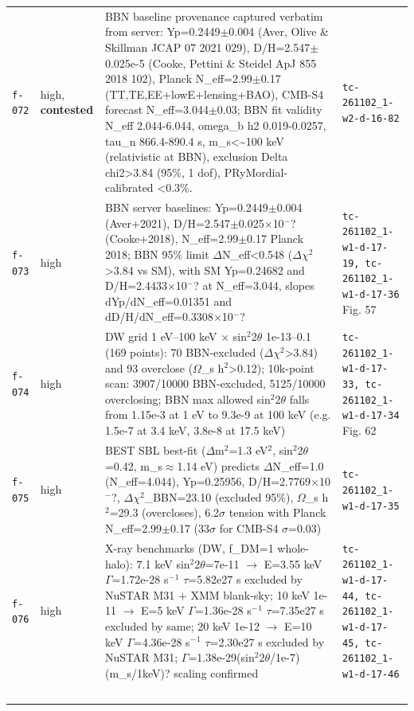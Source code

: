 \documentclass[11pt,a4paper]{article}
\begin{document}
\begin{longtable}{@{}p{}p{}p{}p{}@{}}
\texttt{f-072} & high, \textbf{contested} & BBN baseline provenance captured verbatim from server: Yp=0.2449$\pm$0.004 (Aver, Olive \& Skillman JCAP 07 2021 029), D/H=2.547$\pm$0.025e-5 (Cooke, Pettini \& Steidel ApJ 855 2018 102), Planck N\_eff=2.99$\pm$0.17 (TT,TE,EE+lowE+lensing+BAO), CMB-S4 forecast N\_eff=3.044$\pm$0.03; BBN fit validity N\_eff 2.044-6.044, omega\_b h2 0.019-0.0257, tau\_n 866.4-890.4 s, m\_s\textless{}\textasciitilde{}100 keV (relativistic at BBN), exclusion Delta chi2\textgreater{}3.84 (95\%, 1 dof), PRyMordial-calibrated \textless{}0.3\%. & \texttt{tc-261102\_\allowbreak{}1-w2-d-16-82} \\
\texttt{f-073} & high & BBN server baselines: Yp=0.2449$\pm$0.004 (Aver+2021), D/H=2.547$\pm$0.025$\times$10$^-$? (Cooke+2018), N\_eff=2.99$\pm$0.17 Planck 2018; BBN 95\% limit $\Delta$N\_eff\textless{}0.548 ($\Delta$$\chi$$^2$\textgreater{}3.84 vs SM), with SM Yp=0.24682 and D/H=2.4433$\times$10$^-$? at N\_eff=3.044, slopes dYp/dN\_eff=0.01351 and dD/H/dN\_eff=0.3308$\times$10$^-$? & \texttt{tc-261102\_\allowbreak{}1-w1-d-17-19,\allowbreak{} tc-261102\_\allowbreak{}1-w1-d-17-36} Fig. 57 \\
\texttt{f-074} & high & DW grid 1 eV--100 keV $\times$ sin$^2$2$\theta$ 1e-13--0.1 (169 points): 70 BBN-excluded ($\Delta$$\chi$$^2$\textgreater{}3.84) and 93 overclose ($\Omega$\_s h$^2$\textgreater{}0.12); 10k-point scan: 3907/10000 BBN-excluded, 5125/10000 overclosing; BBN max allowed sin$^2$2$\theta$ falls from 1.15e-3 at 1 eV to 9.3e-9 at 100 keV (e.g. 1.5e-7 at 3.4 keV, 3.8e-8 at 17.5 keV) & \texttt{tc-261102\_\allowbreak{}1-w1-d-17-33,\allowbreak{} tc-261102\_\allowbreak{}1-w1-d-17-34} Fig. 62 \\
\texttt{f-075} & high & BEST SBL best-fit ($\Delta$m$^2$=1.3 eV$^2$, sin$^2$2$\theta$=0.42, m\_s$\approx$1.14 eV) predicts $\Delta$N\_eff=1.0 (N\_eff=4.044), Yp=0.25956, D/H=2.7769$\times$10$^-$?, $\Delta$$\chi$$^2$\_BBN=23.10 (excluded 95\%), $\Omega$\_s h$^2$=29.3 (overcloses), 6.2$\sigma$ tension with Planck N\_eff=2.99$\pm$0.17 (33$\sigma$ for CMB-S4 $\sigma$=0.03) & \texttt{tc-261102\_\allowbreak{}1-w1-d-17-35} \\
\texttt{f-076} & high & X-ray benchmarks (DW, f\_DM=1 whole-halo): 7.1 keV sin$^2$2$\theta$=7e-11 $\to$ E=3.55 keV $\Gamma$=1.72e-28 s$^-$$^1$ $\tau$=5.82e27 s excluded by NuSTAR M31 + XMM blank-sky; 10 keV 1e-11 $\to$ E=5 keV $\Gamma$=1.36e-28 s$^-$$^1$ $\tau$=7.35e27 s excluded by same; 20 keV 1e-12 $\to$ E=10 keV $\Gamma$=4.36e-28 s$^-$$^1$ $\tau$=2.30e27 s excluded by NuSTAR M31; $\Gamma$=1.38e-29(sin$^2$2$\theta$/1e-7)(m\_s/1keV)? scaling confirmed & \texttt{tc-261102\_\allowbreak{}1-w1-d-17-44,\allowbreak{} tc-261102\_\allowbreak{}1-w1-d-17-45,\allowbreak{} tc-261102\_\allowbreak{}1-w1-d-17-46} \\
$$
\end{longtable}
\end{document}
